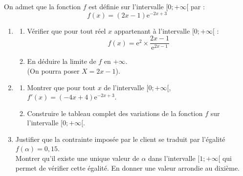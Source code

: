 \documentclass[12pt,a4paper]{article}
\begin{document}
On admet que la fonction $f$ est définie sur l'intervalle $[0 ; +\infty[$ par :
$$f(x) = (2x - 1)\text{e}^{-2x+3}$$

\begin{enumerate}
    \item 
    \begin{enumerate}
        \item[a.] Vérifier que pour tout réel $x$ appartenant à l'intervalle $[0 ; +\infty[$ :
        $$f(x) = \text{e}^2 \times \frac{2x - 1}{\text{e}^{2x-1}}$$
        \item[b.] En déduire la limite de $f$ en $+\infty$.\\
        (On pourra poser $X = 2x - 1$).
    \end{enumerate}
    \item 
    \begin{enumerate}
        \item[a.] Montrer que pour tout $x$ de l'intervalle $[0 ; +\infty[$, $f'(x) = (-4x + 4)\text{e}^{-2x+3}$.
        \item[b.] Construire le tableau complet des variations de la fonction $f$ sur l'intervalle $[0 ; +\infty[$.
    \end{enumerate}
    \item Justifier que la contrainte imposée par le client se traduit par l'égalité $f(\alpha) = 0,15$.\\
    Montrer qu'il existe une unique valeur de $\alpha$ dans l'intervalle $[1 ; +\infty[$ qui permet de vérifier cette égalité. En donner une valeur arrondie au dixième.
\end{enumerate}
\end{document}
